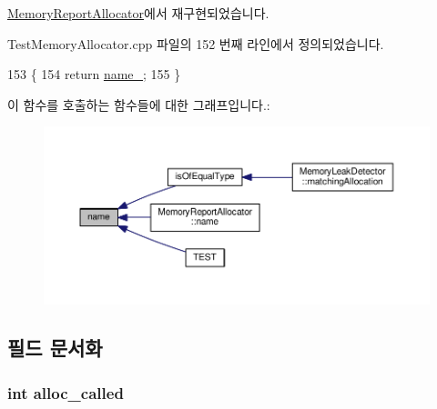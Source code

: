 \hyperlink{class_memory_report_allocator_a90b3e100eca6e28565e6447326b1f7b0}{Memory\+Report\+Allocator}에서 재구현되었습니다.



Test\+Memory\+Allocator.\+cpp 파일의 152 번째 라인에서 정의되었습니다.


\begin{DoxyCode}
153 \{
154     \textcolor{keywordflow}{return} \hyperlink{class_test_memory_allocator_a7dac8366c11fbcad2f49d85fe8fc4fbe}{name\_};
155 \}
\end{DoxyCode}


이 함수를 호출하는 함수들에 대한 그래프입니다.\+:
\nopagebreak
\begin{figure}[H]
\begin{center}
\leavevmode
\includegraphics[width=350pt]{class_test_memory_allocator_a6a96605bec5749750a0b4be6e2d6e721_icgraph}
\end{center}
\end{figure}




\subsection{필드 문서화}
\subsubsection[{\texorpdfstring{alloc\+\_\+called}{alloc_called}}]{\setlength{\rightskip}{0pt plus 5cm}int alloc\+\_\+called}\hypertarget{class_allocator_for_memory_leak_detection_test_a2804c2bae21eb67c6534a07ff8bcb052}{}\label{class_allocator_for_memory_leak_detection_test_a2804c2bae21eb67c6534a07ff8bcb052}


